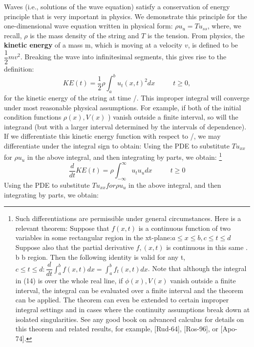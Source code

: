 \documentclass[../main.tex]{subfiles}
\begin{document}
Waves (i.e., solutions of the wave equation) satisfy a conservation of energy 
principle that is very important in physics. We demonstrate this principle for the 
one-dimensional wave equation written in physical form: $\rho u_u = Tu_{ss}$, where, we recall, $ \rho $ is the mass density of the string and $T$ is the tension. From physics, the 
\textbf{kinetic energy} of a mass m, which is moving at a velocity $v$, is defined to be $\dfrac{1}{2}mv^2$. Breaking the wave into infinitesimal segments, this gives rise to the 
definition: 
\begin{equation}
KE(t)=\dfrac{1}{2} \rho \int_a^b u_t (x,t)^2 dx ~~~~~~~~~~~~ t\geq 0, 
\end{equation}
for the kinetic energy of the string at time /. This improper integral will converge 
under most reasonable physical assumptions. For example, if both of the initial 
condition functions  $ \rho (x), V(x)$ ) vanish outside a finite interval, so will the 
integrand (but with a larger interval determined by the intervals of dependence). If we differentiate this kinetic energy function with respect to /, we may differentiate 
under the integral sign to obtain: 
Using the PDE to substitute $ Tu_{xx}$for $\rho u_u$ in the above integral, and then 
integrating by parts, we obtain: 
\footnote{ Such differentiations are permissible under general circumstances. Here is a relevant theorem: 
Suppose that $f(x,t)$ is a continuous function of two variables in some rectangular region in the xt-plane:$a\leqslant x\leqslant b, c\leqslant t \leqslant d$ Suppose also that the partial derivative $f,(x,t)$ is continuous in this same 
. b b region. Then the following identity is valid for any t, $c\leqslant t \leqslant d : \dfrac{d}{dt} \int_{a}^{b} f(x,t)dx=\int_{a}^{b} f_t (x,t) dx$. Note that 
although the integral in (14) is over the whole real line, if $\phi(x), V(x)$ vanish outside a finite interval, 
the integral can be evaluated over a finite interval and the theorem can be applied. The theorem can 
even be extended to certain improper integral settings and in cases where the continuity assumptions 
break down at isolated singularities. See any good book on advanced calculus for details on this 
theorem and related results, for example, [Rud-64], [Ros-96], or [Apo-74]. } 
\begin{equation}
\frac{d}{dt} KE(t)=\rho \int_{-\infty}^{\infty} u_t u_u dx ~~~~~~~~~~~~ t\geq 0
\end{equation}
Using the PDE to substitute $Tu_{xx} for \rho u_u$ in the above integral, and then 
integrating by parts, we obtain:
\end{document}
